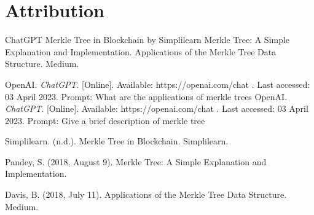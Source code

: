 \documentclass{article}
\begin{document}
\section{Attribution}
ChatGPT
\newline
Merkle Tree in Blockchain by Simplilearn
\newline
Merkle Tree: A Simple Explanation and Implementation. 
\newline
Applications of the Merkle Tree Data Structure. Medium. 
  \begin{thebibliography}{9}
  OpenAI. \textit{ChatGPT}. [Online]. Available: https://openai.com/chat . Last accessed: 03 April 2023. Prompt: What are the applications of merkle trees
  OpenAI. \textit{ChatGPT}. [Online]. Available: https://openai.com/chat . Last accessed: 03 April 2023. Prompt: Give a brief description of merkle tree

  Simplilearn. (n.d.). Merkle Tree in Blockchain. Simplilearn. 

  Pandey, S. (2018, August 9). Merkle Tree: A Simple Explanation and Implementation. 

  Davis, B. (2018, July 11). Applications of the Merkle Tree Data Structure. Medium. 
  \end{thebibliography}
\end{document}
